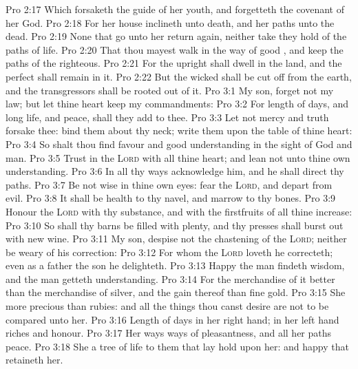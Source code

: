 \vs Pro 2:17 Which forsaketh the guide of her youth, and forgetteth the covenant of her God.
\vs Pro 2:18 For her house inclineth unto death, and her paths unto the dead.
\vs Pro 2:19 None that go unto her return again, neither take they hold of the paths of life.
\vs Pro 2:20 That thou mayest walk in the way of good , and keep the paths of the righteous.
\vs Pro 2:21 For the upright shall dwell in the land, and the perfect shall remain in it.
\vs Pro 2:22 But the wicked shall be cut off from the earth, and the transgressors shall be rooted out of it.
\vs Pro 3:1 My son, forget not my law; but let thine heart keep my commandments:
\vs Pro 3:2 For length of days, and long life, and peace, shall they add to thee.
\vs Pro 3:3 Let not mercy and truth forsake thee: bind them about thy neck; write them upon the table of thine heart:
\vs Pro 3:4 So shalt thou find favour and good understanding in the sight of God and man.
\vs Pro 3:5 Trust in the \textsc{Lord} with all thine heart; and lean not unto thine own understanding.
\vs Pro 3:6 In all thy ways acknowledge him, and he shall direct thy paths.
\vs Pro 3:7 Be not wise in thine own eyes: fear the \textsc{Lord}, and depart from evil.
\vs Pro 3:8 It shall be health to thy navel, and marrow to thy bones.
\vs Pro 3:9 Honour the \textsc{Lord} with thy substance, and with the firstfruits of all thine increase:
\vs Pro 3:10 So shall thy barns be filled with plenty, and thy presses shall burst out with new wine.
\vs Pro 3:11 My son, despise not the chastening of the \textsc{Lord}; neither be weary of his correction:
\vs Pro 3:12 For whom the \textsc{Lord} loveth he correcteth; even as a father the son  he delighteth.
\vs Pro 3:13 Happy  the man  findeth wisdom, and the man  getteth understanding.
\vs Pro 3:14 For the merchandise of it  better than the merchandise of silver, and the gain thereof than fine gold.
\vs Pro 3:15 She  more precious than rubies: and all the things thou canst desire are not to be compared unto her.
\vs Pro 3:16 Length of days  in her right hand;  in her left hand riches and honour.
\vs Pro 3:17 Her ways  ways of pleasantness, and all her paths  peace.
\vs Pro 3:18 She  a tree of life to them that lay hold upon her: and happy  that retaineth her.
